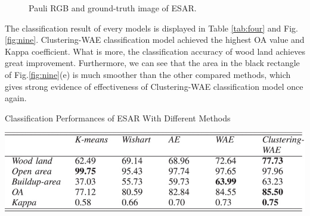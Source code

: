 \documentclass[11pt, a4paper, onecolumn, oneside]{article}
\begin{document}
\begin{figure}
\caption{Pauli RGB and ground-truth image of ESAR.}
\label{fig:eight}
\end{figure}

The classification result of every models is displayed in Table \ref{tab:four} and Fig.\ref{fig:nine}. Clustering-WAE classification model achieved the highest OA value and Kappa coefficient. What is more, the classification accuracy of wood land achieves great improvement. Furthermore, we can see that the area in the black rectangle of Fig.\ref{fig:nine}(e) is much smoother than the other compared methods, which gives strong evidence of effectiveness of Clustering-WAE classification model once again.

\begin{table}
  \caption{ Classification Performances of ESAR With Different Methods}
  \label{tab:four}
  \includegraphics[width=\linewidth]{table_4.jpg}
\end{table}
\end{document}
